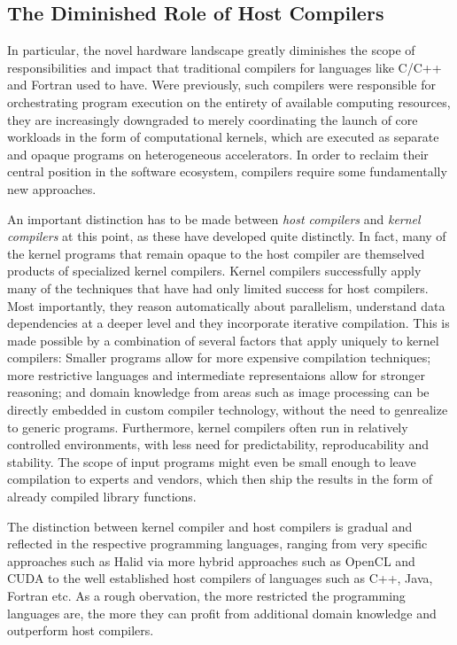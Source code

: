    \subsection*{The Diminished Role of Host Compilers}

    In particular, the novel hardware landscape greatly diminishes the
    scope of responsibilities and impact that traditional compilers for
    languages like C/C++ and Fortran used to have.
    Were previously, such compilers were responsible for orchestrating
    program execution on the entirety of available computing resources, they are
    increasingly downgraded to merely coordinating the launch of core workloads
    in the form of computational kernels, which are executed as separate and
    opaque programs on heterogeneous accelerators.
    In order to reclaim their central position in the software ecosystem,
    compilers require some fundamentally new approaches.

    An important distinction has to be made between {\em host compilers} and
    {\em kernel compilers} at this point, as these have developed quite
    distinctly.
    In fact, many of the kernel programs that remain opaque to the host compiler
    are themselved products of specialized kernel compilers.
    Kernel compilers successfully apply many of the techniques that have had
    only limited success for host compilers.
    Most importantly, they reason automatically about parallelism, understand
    data dependencies at a deeper level and they incorporate iterative
    compilation.
    This is made possible by a combination of several factors that apply
    uniquely to kernel compilers:
    Smaller programs allow for more expensive compilation techniques;
    more restrictive languages and intermediate representaions allow for
    stronger reasoning;
    and domain knowledge from areas such as image processing can be directly
    embedded in custom compiler technology, without the need to genrealize to
    generic programs.
    Furthermore, kernel compilers often run in relatively controlled
    environments, with less need for predictability, reproducability and
    stability.
    The scope of input programs might even be small enough to leave compilation
    to experts and vendors, which then ship the results in the form of already
    compiled library functions.

    The distinction between kernel compiler and host compilers is gradual and
    reflected in the respective programming languages, ranging from
    very specific approaches such as Halid via more hybrid approaches such as
    OpenCL and CUDA to the well established host compilers of languages such as
    C++, Java, Fortran etc.
    As a rough obervation, the more restricted the programming languages are,
    the more they can profit from additional domain knowledge and outperform
    host compilers.

